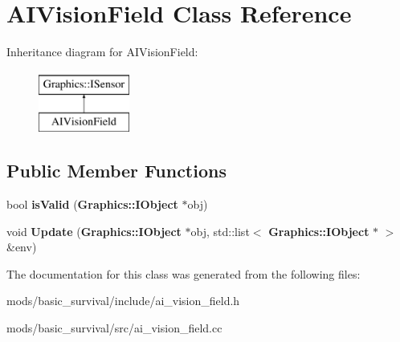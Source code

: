 \section{A\+I\+Vision\+Field Class Reference}
\label{class_a_i_vision_field}
Inheritance diagram for A\+I\+Vision\+Field\+:\begin{figure}[H]
\begin{center}
\leavevmode
\includegraphics[height=2.000000cm]{class_a_i_vision_field}
\end{center}
\end{figure}
\subsection*{Public Member Functions}
\begin{DoxyCompactItemize}
\item 
bool {\bfseries is\+Valid} ({\bf Graphics\+::\+I\+Object} $\ast$obj)\label{class_a_i_vision_field_a800c0a1bc9a631c08935c6d7a7478208}

\item 
void {\bfseries Update} ({\bf Graphics\+::\+I\+Object} $\ast$obj, std\+::list$<$ {\bf Graphics\+::\+I\+Object} $\ast$ $>$ \&env)\label{class_a_i_vision_field_a97609f88baacf59e0cc9fae6245ba7b9}

\end{DoxyCompactItemize}


The documentation for this class was generated from the following files\+:\begin{DoxyCompactItemize}
\item 
mods/basic\+\_\+survival/include/ai\+\_\+vision\+\_\+field.\+h\item 
mods/basic\+\_\+survival/src/ai\+\_\+vision\+\_\+field.\+cc\end{DoxyCompactItemize}
